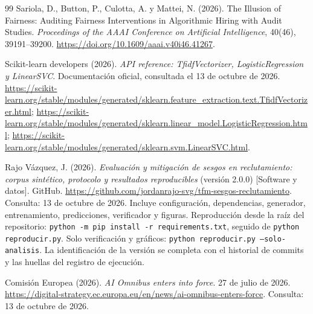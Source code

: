 \begin{thebibliography}{99}
 Sariola, D., Button, P., Culotta, A. y Mattei, N. (2026). The Illusion of Fairness: Auditing Fairness Interventions in Algorithmic Hiring with Audit Studies. \textit{Proceedings of the AAAI Conference on Artificial Intelligence}, 40(46), 39191--39200. \url{https://doi.org/10.1609/aaai.v40i46.41267}.

 Scikit-learn developers (2026). \textit{API reference: TfidfVectorizer, LogisticRegression y LinearSVC}. Documentación oficial, consultada el 13 de octubre de 2026. \url{https://scikit-learn.org/stable/modules/generated/sklearn.feature_extraction.text.TfidfVectorizer.html}; \url{https://scikit-learn.org/stable/modules/generated/sklearn.linear_model.LogisticRegression.html}; \url{https://scikit-learn.org/stable/modules/generated/sklearn.svm.LinearSVC.html}.

 Rajo Vázquez, J. (2026). \textit{Evaluación y mitigación de sesgos en reclutamiento: corpus sintético, protocolo y resultados reproducibles} (versión 2.0.0) [Software y datos]. GitHub. \url{https://github.com/jordanrajo-svg/tfm-sesgos-reclutamiento}. Consulta: 13 de octubre de 2026. Incluye configuración, dependencias, generador, entrenamiento, predicciones, verificador y figuras. Reproducción desde la raíz del repositorio: \texttt{python -m pip install -r requirements.txt}, seguido de \texttt{python reproducir.py}. Solo verificación y gráficos: \texttt{python reproducir.py --solo-analisis}. La identificación de la versión se completa con el historial de commits y las huellas del registro de ejecución.

 Comisión Europea (2026). \textit{AI Omnibus enters into force}. 27 de julio de 2026. \url{https://digital-strategy.ec.europa.eu/en/news/ai-omnibus-enters-force}. Consulta: 13 de octubre de 2026.
\end{thebibliography}